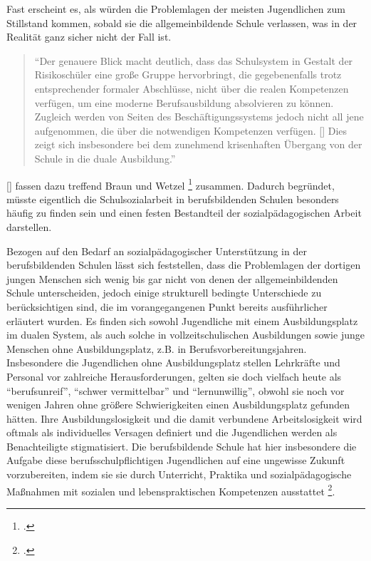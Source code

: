Fast erscheint es, als würden die Problemlagen der meisten Jugendlichen zum Stillstand kommen, sobald sie die allgemeinbildende Schule verlassen, was in der Realität ganz sicher nicht der Fall ist. 

\begin{quotation}
\noindent
"`Der genauere Blick macht deutlich, dass das Schulsystem in Gestalt der Risikoschüler eine große Gruppe hervorbringt, die gegebenenfalls trotz entsprechender formaler Abschlüsse, nicht über die realen Kompetenzen verfügen, um eine moderne Berufsausbildung absolvieren zu können. Zugleich werden von Seiten des Beschäftigungssystems jedoch nicht all jene aufgenommen, die über die notwendigen Kompetenzen verfügen. [\punkte] Dies zeigt sich insbesondere bei dem zunehmend krisenhaften Übergang von der Schule in die duale Ausbildung."'
\end{quotation}

[\punkte] fassen dazu treffend  Braun und Wetzel \footcite[181]{Braun2006} zusammen. Dadurch begründet, müsste eigentlich die Schulsozialarbeit in berufsbildenden Schulen besonders häufig zu finden sein und einen festen Bestandteil der sozialpädagogischen Arbeit darstellen.

Bezogen auf den Bedarf an sozialpädagogischer Unterstützung in der berufsbildenden Schulen lässt sich feststellen, dass die Problemlagen der dortigen jungen Menschen sich wenig bis gar nicht von denen der allgemeinbildenden Schule unterscheiden, jedoch einige strukturell bedingte Unterschiede zu berücksichtigen sind, die im vorangegangenen Punkt bereits ausführlicher erläutert wurden. Es finden sich sowohl Jugendliche mit einem Ausbildungsplatz im dualen System, als auch solche in vollzeitschulischen Ausbildungen sowie junge Menschen ohne Ausbildungsplatz, z.B. in Berufsvorbereitungsjahren. Insbesondere die Jugendlichen ohne Ausbildungsplatz stellen Lehrkräfte und Personal vor zahlreiche Herausforderungen, gelten sie doch vielfach heute als "`berufsunreif"', "`schwer vermittelbar"' und "`lernunwillig"', obwohl sie noch vor wenigen Jahren ohne größere Schwierigkeiten einen Ausbildungsplatz gefunden hätten. Ihre Ausbildungslosigkeit und die damit verbundene Arbeitslosigkeit wird oftmals als individuelles Versagen definiert und die Jugendlichen werden als Benachteiligte stigmatisiert. Die berufsbildende Schule hat hier insbesondere die Aufgabe diese berufsschulpflichtigen Jugendlichen auf eine ungewisse Zukunft vorzubereiten, indem sie sie durch Unterricht, Praktika und sozialpädagogische Maßnahmen mit sozialen und lebenspraktischen Kompetenzen ausstattet \footcite[vgl.][6]{ASSB2011}. 

